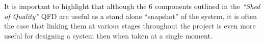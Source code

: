 \documentclass{article}
\begin{document}
It is important to highlight that although the 6 components outlined in the \textit{``Shed of Quality''} QFD are useful as a stand alone ``snapshot'' of the system, it is often the case that linking them at various stages throughout the project is even more useful for designing a system then when taken at a single moment. 
\end{document}
